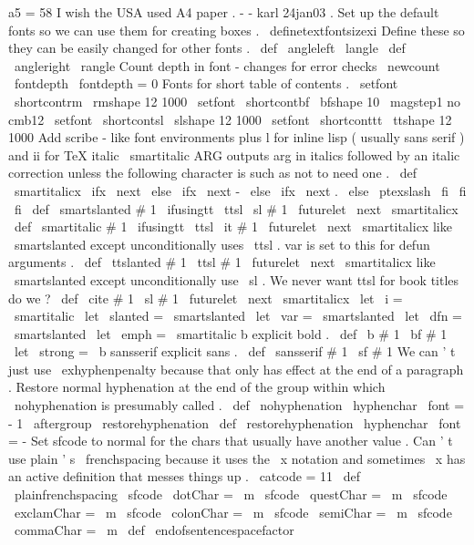 {a5
=
58
%
%
I
wish
the
USA
used
A4
paper
.
%
-
-
karl
24jan03
.
%
Set
up
the
default
fonts
so
we
can
use
them
for
creating
boxes
.
%
\
definetextfontsizexi
%
Define
these
so
they
can
be
easily
changed
for
other
fonts
.
\
def
\
angleleft
{
\
langle
}
\
def
\
angleright
{
\
rangle
}
%
Count
depth
in
font
-
changes
for
error
checks
\
newcount
\
fontdepth
\
fontdepth
=
0
%
Fonts
for
short
table
of
contents
.
\
setfont
\
shortcontrm
\
rmshape
{
12
}
{
1000
}
\
setfont
\
shortcontbf
\
bfshape
{
10
}
{
\
magstep1
}
%
no
cmb12
\
setfont
\
shortcontsl
\
slshape
{
12
}
{
1000
}
\
setfont
\
shortconttt
\
ttshape
{
12
}
{
1000
}
%
%
Add
scribe
-
like
font
environments
plus
l
for
inline
lisp
(
usually
sans
%
%
serif
)
and
ii
for
TeX
italic
%
\
smartitalic
{
ARG
}
outputs
arg
in
italics
followed
by
an
italic
correction
%
unless
the
following
character
is
such
as
not
to
need
one
.
\
def
\
smartitalicx
{
\
ifx
\
next
\
else
\
ifx
\
next
-
\
else
\
ifx
\
next
.
\
else
\
ptexslash
\
fi
\
fi
\
fi
}
\
def
\
smartslanted
#
1
{
{
\
ifusingtt
\
ttsl
\
sl
#
1
}
\
futurelet
\
next
\
smartitalicx
}
\
def
\
smartitalic
#
1
{
{
\
ifusingtt
\
ttsl
\
it
#
1
}
\
futurelet
\
next
\
smartitalicx
}
%
like
\
smartslanted
except
unconditionally
uses
\
ttsl
.
%
var
is
set
to
this
for
defun
arguments
.
\
def
\
ttslanted
#
1
{
{
\
ttsl
#
1
}
\
futurelet
\
next
\
smartitalicx
}
%
like
\
smartslanted
except
unconditionally
use
\
sl
.
We
never
want
%
ttsl
for
book
titles
do
we
?
\
def
\
cite
#
1
{
{
\
sl
#
1
}
\
futurelet
\
next
\
smartitalicx
}
\
let
\
i
=
\
smartitalic
\
let
\
slanted
=
\
smartslanted
\
let
\
var
=
\
smartslanted
\
let
\
dfn
=
\
smartslanted
\
let
\
emph
=
\
smartitalic
%
b
explicit
bold
.
\
def
\
b
#
1
{
{
\
bf
#
1
}
}
\
let
\
strong
=
\
b
%
sansserif
explicit
sans
.
\
def
\
sansserif
#
1
{
{
\
sf
#
1
}
}
%
We
can
'
t
just
use
\
exhyphenpenalty
because
that
only
has
effect
at
%
the
end
of
a
paragraph
.
Restore
normal
hyphenation
at
the
end
of
the
%
group
within
which
\
nohyphenation
is
presumably
called
.
%
\
def
\
nohyphenation
{
\
hyphenchar
\
font
=
-
1
\
aftergroup
\
restorehyphenation
}
\
def
\
restorehyphenation
{
\
hyphenchar
\
font
=
-
}
%
Set
sfcode
to
normal
for
the
chars
that
usually
have
another
value
.
%
Can
'
t
use
plain
'
s
\
frenchspacing
because
it
uses
the
\
x
notation
and
%
sometimes
\
x
has
an
active
definition
that
messes
things
up
.
%
\
catcode
=
11
\
def
\
plainfrenchspacing
{
%
\
sfcode
\
dotChar
=
\
m
\
sfcode
\
questChar
=
\
m
\
sfcode
\
exclamChar
=
\
m
\
sfcode
\
colonChar
=
\
m
\
sfcode
\
semiChar
=
\
m
\
sfcode
\
commaChar
=
\
m
\
def
\
endofsentencespacefactor
}}
